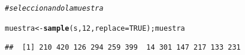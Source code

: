 \documentclass[12pt,letterpaper]{article}\usepackage[]{graphicx}\usepackage[]{color}
\makeatletter
\newcommand{\hlnum}[1]{\textcolor[rgb]{0.686,0.059,0.569}{#1}}%
\newcommand{\hlcom}[1]{\textcolor[rgb]{0.678,0.584,0.686}{\textit{#1}}}%
\newcommand{\hlstd}[1]{\textcolor[rgb]{0.345,0.345,0.345}{#1}}%
\newcommand{\hlkwb}[1]{\textcolor[rgb]{0.69,0.353,0.396}{#1}}%
\newcommand{\hlkwc}[1]{\textcolor[rgb]{0.333,0.667,0.333}{#1}}%
\newcommand{\hlkwd}[1]{\textcolor[rgb]{0.737,0.353,0.396}{\textbf{#1}}}%
\newenvironment{kframe}{%
 \def\at@end@of@kframe{}%
 \ifinner\ifhmode%
  \def\at@end@of@kframe{\end{minipage}}%
  \begin{minipage}{\columnwidth}%
 \fi\fi%
 \def\FrameCommand##1{\hskip\@totalleftmargin \hskip-\fboxsep
 \colorbox{shadecolor}{##1}\hskip-\fboxsep
     \hskip-\linewidth \hskip-\@totalleftmargin \hskip\columnwidth}%
 \MakeFramed {\advance\hsize-\width
   \@totalleftmargin\z@ \linewidth\hsize
   \@setminipage}}%
 {\par\unskip\endMakeFramed%
 \at@end@of@kframe}
\newenvironment{knitrout}{}{} %
\makeatother
\begin{document}
\begin{enumerate}
\begin{knitrout}
\color{fgcolor}\begin{kframe}
\begin{alltt}
\hlcom{# seleccionando la muestra }

\hlstd{muestra} \hlkwb{<-} \hlkwd{sample}\hlstd{(s,} \hlnum{12}\hlstd{,} \hlkwc{replace}\hlstd{=}\hlnum{TRUE}\hlstd{); muestra}
\end{alltt}
\begin{verbatim}
##  [1] 210 420 126 294 259 399  14 301 147 217 133 231
\end{verbatim}
\end{kframe}
\end{knitrout}


  
  
  
  
  
  
  
  
  
  
  
  
  
  
  
  
  
  
  
  







  
  
  
  
  
  
  
  
  
  
  
  
  
  
  
  
\end{enumerate}
\end{document}
